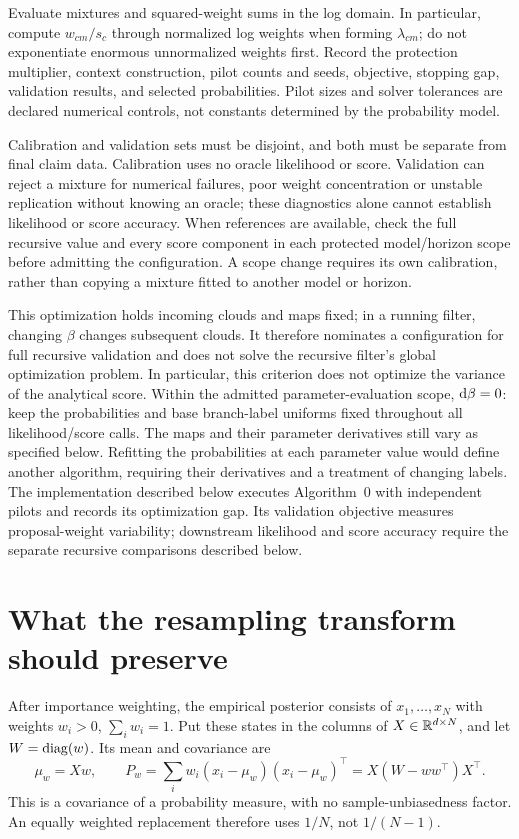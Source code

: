 Evaluate mixtures and squared-weight sums in the log domain. In particular,
compute \(w_{cm}/s_c\) through normalized log weights when forming
\(\lambda_{cm}\); do not exponentiate enormous unnormalized weights first.
Record the protection multiplier, context construction, pilot counts and
seeds, objective, stopping gap, validation results, and selected
probabilities. Pilot sizes and solver tolerances are declared numerical
controls, not constants determined by the probability model.

Calibration and validation sets must be disjoint, and both must be
separate from final claim data. Calibration uses no oracle likelihood or
score. Validation can reject a mixture for numerical failures, poor weight
concentration or unstable replication without knowing an oracle; these
diagnostics alone cannot establish likelihood or score accuracy. When
references are available, check the full recursive value and every score
component in each protected model/horizon scope before admitting the
configuration. A scope change requires its own calibration, rather than
copying a mixture fitted to another model or horizon.

This optimization holds incoming clouds and maps fixed; in a running filter,
changing \(\beta\) changes subsequent clouds. It therefore nominates a
configuration for full recursive validation and does not solve the recursive
filter's global optimization problem. In particular, this criterion does
not optimize the variance of the analytical score. Within the admitted
parameter-evaluation scope, \(\mathrm d\beta=0\): keep the probabilities and
base branch-label uniforms fixed throughout all likelihood/score calls.
The maps and their parameter derivatives still vary as specified below.
Refitting the probabilities at each parameter value would define another
algorithm, requiring their derivatives and a treatment of changing labels.
The implementation described below executes Algorithm~0 with independent
pilots and records its optimization gap. Its validation objective measures
proposal-weight variability; downstream likelihood and score accuracy require
the separate recursive comparisons described below.


\section{What the resampling transform should preserve}

After importance weighting, the empirical posterior consists of
\(x_1,\ldots,x_N\) with weights \(w_i>0\), \(\sum_iw_i=1\). Put these states
in the columns of \(X\in\mathbb R^{d\times N}\), and let \(W=\operatorname{diag}(w)\). Its mean
and covariance are
\begin{equation}
\label{eq:bf-covariance-proposal-weighted-moments}
 \mu_w=Xw,\qquad
 P_w=\sum_iw_i(x_i-\mu_w)(x_i-\mu_w)^\top
     =X(W-ww^\top)X^\top .
\end{equation}
This is a covariance of a probability measure, with no sample-unbiasedness
factor. An equally weighted replacement therefore uses \(1/N\), not
\(1/(N-1)\).

